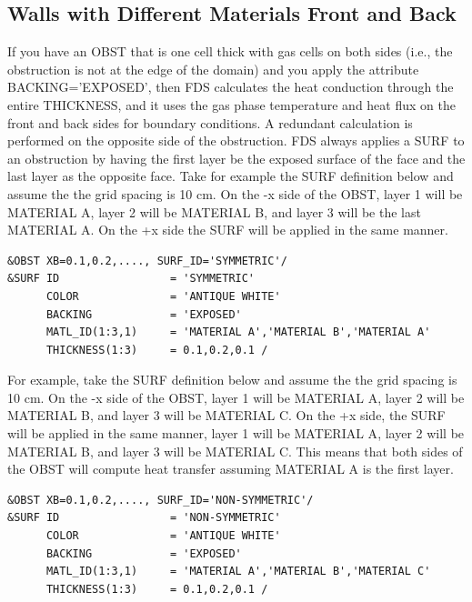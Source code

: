 \documentclass[11pt]{book}
\begin{document}
\subsection{Walls with Different Materials Front and Back}
\label{info:EXPOSED}

If you have an {\ct OBST} that is one cell thick with gas cells on both sides (i.e., the obstruction is not at the edge of the domain) and you apply the attribute {\ct BACKING='EXPOSED'}, then FDS calculates the heat conduction through the entire {\ct THICKNESS}, and it uses the gas phase temperature and heat flux on the front and back sides for boundary conditions. A redundant calculation is performed on the opposite side of the obstruction.  FDS always applies a {\ct SURF} to an obstruction by having the first layer be the exposed surface of the face and the last layer as the opposite face.  Take for example the {\ct SURF} definition below and assume the the grid spacing is 10 cm.  On the -x side of the {\ct OBST}, layer 1 will be {\ct MATERIAL A}, layer 2 will be {\ct MATERIAL B}, and layer 3 will be the last {\ct MATERIAL A}.  On the +x side the {\ct SURF} will be applied in the same manner.

\begin{lstlisting}
&OBST XB=0.1,0.2,...., SURF_ID='SYMMETRIC'/
&SURF ID                 = 'SYMMETRIC'
      COLOR              = 'ANTIQUE WHITE'
      BACKING            = 'EXPOSED'
      MATL_ID(1:3,1)     = 'MATERIAL A','MATERIAL B','MATERIAL A'
      THICKNESS(1:3)     = 0.1,0.2,0.1 /
\end{lstlisting}

For example, take the {\ct SURF} definition below and assume the the grid spacing is 10 cm.  On the -x side of the {\ct OBST}, layer 1 will be {\ct MATERIAL A}, layer 2 will be {\ct MATERIAL B}, and layer 3 will be {\ct MATERIAL C}.  On the +x side, the {\ct SURF} will be applied in the same manner, layer 1 will be {\ct MATERIAL A}, layer 2 will be {\ct MATERIAL B}, and layer 3 will be {\ct MATERIAL C}.  This means that both sides of the {\ct OBST} will compute heat transfer assuming {\ct MATERIAL A} is the first layer.

\begin{lstlisting}
&OBST XB=0.1,0.2,...., SURF_ID='NON-SYMMETRIC'/
&SURF ID                 = 'NON-SYMMETRIC'
      COLOR              = 'ANTIQUE WHITE'
      BACKING            = 'EXPOSED'
      MATL_ID(1:3,1)     = 'MATERIAL A','MATERIAL B','MATERIAL C'
      THICKNESS(1:3)     = 0.1,0.2,0.1 /
\end{lstlisting}
\end{document}
